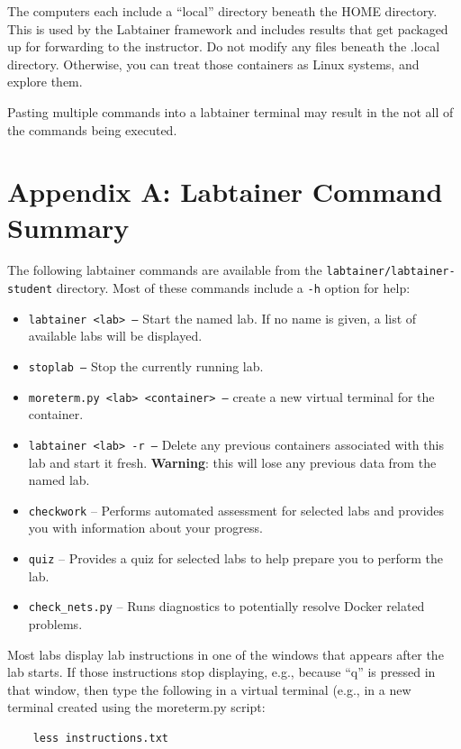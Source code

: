 \documentclass[12pt]{article}
\begin{document}
The computers each include a ``local'' directory beneath the HOME directory.  This is used
by the Labtainer framework and includes results that get packaged up for forwarding to the
instructor.  Do not modify any files beneath the .local directory.  Otherwise, you can treat
those containers as Linux systems, and explore them.

Pasting multiple commands into a labtainer terminal may result in the not all of the
commands being executed.

\appendix 
{}
\setcounter{page}{3}
\section* {Appendix A: Labtainer Command Summary}
\label{sec:appendixA}
The following labtainer commands are available from the \texttt{labtainer/labtainer-student}
directory.  Most of these commands include a {\tt -h} option for help:
\begin{itemize}
\item \texttt{labtainer <lab> --}
Start the named lab.  If no name is given, a list of available labs will be displayed.
\item \texttt{stoplab  --} Stop the currently running lab.
\item \texttt{moreterm.py <lab> <container> --} create a new virtual terminal for the container.
\item \texttt{labtainer <lab> -r --}
Delete any previous containers associated with this lab and start it fresh.  \textbf{Warning}: this will lose any
previous data from the named lab.
\item \texttt{checkwork} -- Performs automated assessment for selected labs and provides you with information about your progress.
\item \texttt{quiz} -- Provides a quiz for selected labs to help prepare you to perform the lab.
\item \texttt{check\_nets.py} -- Runs diagnostics to potentially resolve Docker related problems.

\end{itemize}

Most labs display lab instructions in one of the windows that appears after the lab starts.  If those instructions
stop displaying, e.g., because ``q'' is pressed in that window, then type the following in a virtual terminal (e.g.,
in a new terminal created using the moreterm.py script:
\begin{verbatim}
    less instructions.txt
\end{verbatim}
\end{document}
